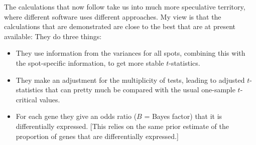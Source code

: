\documentclass[a4paper,9pt]{article}\usepackage[]{graphicx}\usepackage[]{xcolor}
\begin{document}
The calculations that now follow take us into much more speculative
territory, where different software uses different approaches.
My view is that the calculations that are demonstrated are close
to the best that are at present available:  They do three things:
\begin{itemize}
\item They use information from the variances for all spots,
combining this with the spot-specific information, to get
more stable $t$-statistics.
\item They make an adjustment for the multiplicity of tests,
leading to adjusted $t$-statistics that can pretty much be
compared with the usual one-sample $t$-critical values.
\item For each gene they give an odds ratio ($B$ = Bayes factor) that
      it is differentially expressed.  [This relies on the same prior
      estimate of the proportion of genes that are differentially
      expressed.]
\end{itemize}
\end{document}
